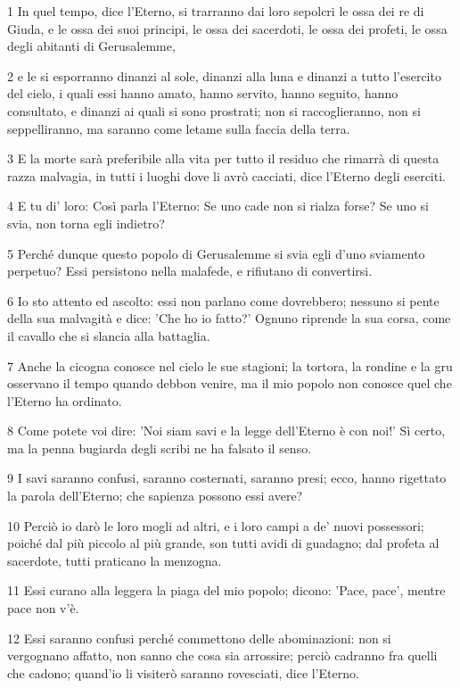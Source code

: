 \par 1 In quel tempo, dice l'Eterno, si trarranno dai loro sepolcri le ossa dei re di Giuda, e le ossa dei suoi principi, le ossa dei sacerdoti, le ossa dei profeti, le ossa degli abitanti di Gerusalemme,
\par 2 e le si esporranno dinanzi al sole, dinanzi alla luna e dinanzi a tutto l'esercito del cielo, i quali essi hanno amato, hanno servito, hanno seguito, hanno consultato, e dinanzi ai quali si sono prostrati; non si raccoglieranno, non si seppelliranno, ma saranno come letame sulla faccia della terra.
\par 3 E la morte sarà preferibile alla vita per tutto il residuo che rimarrà di questa razza malvagia, in tutti i luoghi dove li avrò cacciati, dice l'Eterno degli eserciti.
\par 4 E tu di' loro: Così parla l'Eterno: Se uno cade non si rialza forse? Se uno si svia, non torna egli indietro?
\par 5 Perché dunque questo popolo di Gerusalemme si svia egli d'uno sviamento perpetuo? Essi persistono nella malafede, e rifiutano di convertirsi.
\par 6 Io sto attento ed ascolto: essi non parlano come dovrebbero; nessuno si pente della sua malvagità e dice: 'Che ho io fatto?' Ognuno riprende la sua corsa, come il cavallo che si slancia alla battaglia.
\par 7 Anche la cicogna conosce nel cielo le sue stagioni; la tortora, la rondine e la gru osservano il tempo quando debbon venire, ma il mio popolo non conosce quel che l'Eterno ha ordinato.
\par 8 Come potete voi dire: 'Noi siam savi e la legge dell'Eterno è con noi!' Sì certo, ma la penna bugiarda degli scribi ne ha falsato il senso.
\par 9 I savi saranno confusi, saranno costernati, saranno presi; ecco, hanno rigettato la parola dell'Eterno; che sapienza possono essi avere?
\par 10 Perciò io darò le loro mogli ad altri, e i loro campi a de' nuovi possessori; poiché dal più piccolo al più grande, son tutti avidi di guadagno; dal profeta al sacerdote, tutti praticano la menzogna.
\par 11 Essi curano alla leggera la piaga del mio popolo; dicono: 'Pace, pace', mentre pace non v'è.
\par 12 Essi saranno confusi perché commettono delle abominazioni: non si vergognano affatto, non sanno che cosa sia arrossire; perciò cadranno fra quelli che cadono; quand'io li visiterò saranno rovesciati, dice l'Eterno.
